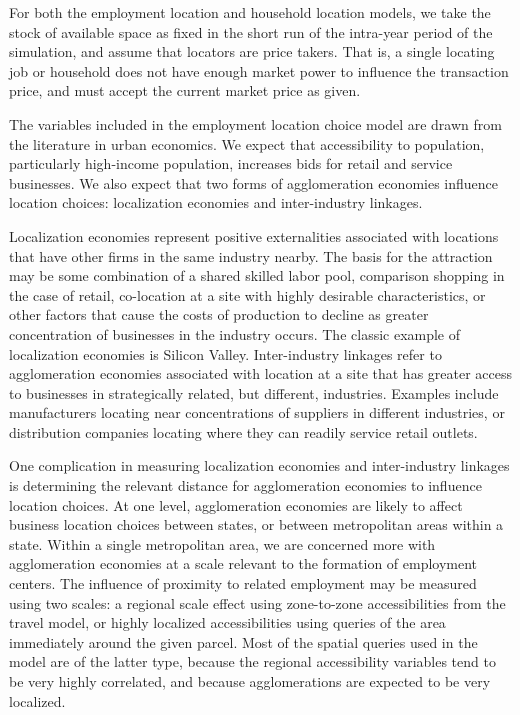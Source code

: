 For both the employment location and household location models, we
take the stock of available space as fixed in the short run of the
intra-year period of the simulation, and assume that locators are
price takers.  That is, a single locating job or household does
not have enough market power to influence the transaction price,
and must accept the current market price as given.

The variables included in the employment location choice model are
drawn from the literature in urban economics.  We expect that
accessibility to population, particularly high-income population,
increases bids for retail and service businesses.  We also expect
that two forms of agglomeration economies influence location
choices: localization economies and inter-industry linkages.

Localization economies represent positive externalities associated
with locations that have other firms in the same industry nearby.
The basis for the attraction may be some combination of a shared
skilled labor pool, comparison shopping in the case of retail,
co-location at a site with highly desirable characteristics, or
other factors that cause the costs of production to decline as
greater concentration of businesses in the industry occurs.  The
classic example of localization economies is Silicon Valley.
Inter-industry linkages refer to agglomeration economies
associated with location at a site that has greater access to
businesses in strategically related, but different, industries.
Examples include manufacturers locating near concentrations of
suppliers in different industries, or distribution companies
locating where they can readily service retail outlets.

One complication in measuring localization economies and
inter-industry linkages is determining the relevant distance for
agglomeration economies to influence location choices.  At one
level, agglomeration economies are likely to affect business
location choices between states, or between metropolitan areas
within a state.  Within a single metropolitan area, we are
concerned more with agglomeration economies at a scale relevant to
the formation of employment centers.  The influence of proximity
to related employment may be measured using two scales: a regional
scale effect using zone-to-zone accessibilities from the travel
model, or highly localized accessibilities using queries of the
area immediately around the given parcel.  Most of the spatial
queries used in the model are of the latter type, because the
regional accessibility variables tend to be very highly
correlated, and because agglomerations are expected to be very
localized.

